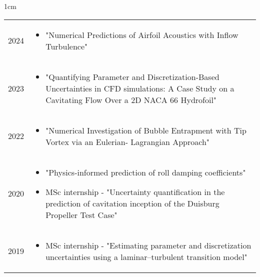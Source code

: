 \documentclass[a4paper,10pt]{article}
\begin{document}
\begin{minipage}{\textwidth}
\begin{adjustwidth}{}{1cm}
{\renewcommand{\arraystretch}{1.2}
\begin{tabular}{l p{15.0cm}}
\textsc{2024} & \vspace{-13pt}\begin{itemize}
    \item "Numerical Predictions of Airfoil Acoustics with Inflow Turbulence"
    \end{itemize}\vspace{-13pt} \\
%
\textsc{2023} & \vspace{-13pt}\begin{itemize}
    \item "Quantifying Parameter and Discretization-Based Uncertainties in CFD simulations: A Case Study on a Cavitating Flow Over a 2D NACA 66 Hydrofoil"
    \end{itemize}\vspace{-13pt} \\
%
\textsc{2022} & \vspace{-13pt}\begin{itemize}
    \item "Numerical Investigation of Bubble Entrapment with Tip Vortex via an Eulerian-
Lagrangian Approach"
    \end{itemize}\vspace{-13pt} \\
%
%
\textsc{2020} & \vspace{-13pt}\begin{itemize}
    \item "Physics-informed prediction of roll damping coefficients"
    \item MSc internship - "Uncertainty quantification in the prediction of cavitation inception of the Duisburg Propeller Test Case"
    \end{itemize}\vspace{-13pt} \\
%
\textsc{2019} & \vspace{-13pt}\begin{itemize}
    \item MSc internship - "Estimating parameter and discretization uncertainties using a laminar–turbulent transition model"

\end{itemize}
\end{tabular}}
\end{adjustwidth}
\end{minipage}
\end{document}
